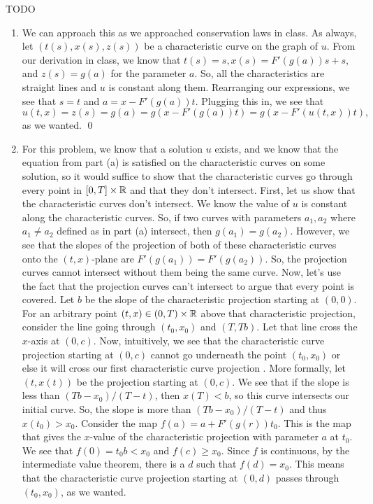 \documentclass{article}
\begin{document}
\newpage
{} TODO
\hop
\solution
\begin{enumerate}
    \item We can approach this as we approached conservation laws in class. As always, let $(t(s), x(s), z(s))$ be a characteristic curve on the graph of $u$. From our derivation in class, we know that $t(s) = s, x(s)= F'(g(a))s + s$, and $z(s) = g(a)$ for the parameter $a$. So, all the characteristics are straight lines and $u$ is constant along them. Rearranging our expressions, we see that $s = t$ and $a = x - F'(g(a))t$. Plugging this in, we see that 
    \[u(t,x) = z(s) = g(a) = g(x - F'(g(a))t) = g(x - F'(u(t,x))t),\]
    as we wanted.  \qed
    \item For this problem, we know that a solution $u$ exists, and we know that the equation from part (a) is satisfied on the characteristic curves on some solution, so it would suffice to show that the characteristic curves go through every point in $[0,T] \times \mathbb{R}$ and that they don't intersect. 
    \hop
    First, let us show that the characteristic curves don't intersect. We know the value of $u$ is constant along the characteristic curves. So, if two curves with parameters $a_1, a_2$ where $a_1 \ne a_2$ defined as in part (a) intersect, then $g(a_1) = g(a_2)$. However, we see that the slopes of the projection of both of these characteristic curves onto the $(t,x)$-plane are  $F'(g(a_1)) = F'(g(a_2))$. So, the projection curves cannot intersect without them being the same curve.
    \hop 
    Now, let's use the fact that the projection curves can't intersect to argue that every point is covered. Let $b$ be the slope of the characteristic projection starting at $(0,0)$. For an arbitrary point $(t,x) \in (0,T) \times \mathbb{R}$ above that characteristic projection, consider the line going through $(t_0,x_0)$ and $(T,Tb)$. Let that line cross the $x$-axis at $(0,c)$. Now, intuitively, we see that the characteristic curve projection starting at $(0,c)$ cannot go underneath the point $(t_0,x_0)$ or else it will cross our first characteristic curve projection . More formally, let $(t,x(t))$ be the projection starting at $(0,c)$. We see that if the slope is less than $(Tb-x_0)/(T-t)$, then $x(T) < b$, so this curve intersects our initial curve. So, the slope is more than $(Tb-x_0)/(T-t)$ and thus $x(t_0) > x_0$. 
    \hop 
    Consider the map $f(a) = a + F'(g(r))t_0$. This is the map that gives the $x$-value of the characteristic projection with parameter $a$ at $t_0$. We see that $f(0) = t_0b < x_0$ and $f(c) \ge x_0$. Since $f$ is continuous, by the intermediate value theorem, there is a $d$ such that $f(d) = x_0$. This means that the characteristic curve projection starting at $(0,d)$ passes through $(t_0,x_0)$, as we wanted. 

\end{enumerate}
\end{document}
